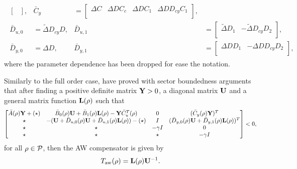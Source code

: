 \documentclass[fleqn,11pt]{article}
\begin{document}
\begin{align*}
\begin{aligned}
\begin{bmatrix}
            \end{bmatrix},&
    \bar C_{y} &= \begin{bmatrix}
                \Delta C & \Delta D C_{c} & \Delta D C_1 & \Delta D D_{cy} C_1\\
            \end{bmatrix},\\
    \bar D_{u,0} &= \tilde\Delta D_{cy}D,&
    \bar D_{u,1} &= \begin{bmatrix}
                \tilde\Delta D_1 & -\tilde\Delta D_{cy}D_2\\
            \end{bmatrix},\\
    \bar D_{y,0} &= \Delta D,&
    \bar D_{y,1} &= \begin{bmatrix}
                \Delta D D_1 & -\Delta D D_{cy}D_2\\
            \end{bmatrix},
    \end{aligned}
\end{align*}
where the parameter dependence has been dropped for ease the notation.

Similarly to the full order case, \citet{Turner2004} have proved with sector boundedness arguments that after finding a positive definite matrix $\mathbf{Y}>0$, a diagonal matrix $\mathbf{U}$ and a general matrix function $\mathbf{L}(\rho)$ such that
\begin{equation*}
    \begin{bmatrix}
    \bar A(\rho)\mathbf{Y}+(\star) & \bar B_{0}(\rho)\mathbf{U}+\bar B_{1}(\rho)\mathbf{L}(\rho)-\mathbf{Y}\bar C_{u}^T(\rho) & 0 & (\bar C_{y}(\rho)\mathbf{Y})^T\\
    \star & -(\mathbf{U}+\bar D_{u,0}(\rho)\mathbf{U}+\bar D_{u,1}(\rho)\mathbf{L}(\rho))-(\star) & I & (\bar D_{y,0}(\rho)\mathbf{U}+\bar D_{y,1}(\rho)\mathbf{L}(\rho))^T\\
    \star & \star & -\gamma I & 0\\
    \star & \star & \star & -\gamma I
    \end{bmatrix}<0,
\end{equation*}
for all $\rho\in\mathcal{P}$, then the AW compensator is given by
\begin{equation*}
    T_{\mathrm{aw}}(\rho) = \mathbf{L}(\rho)\mathbf{U}^{-1}.
\end{equation*}
\end{document}
